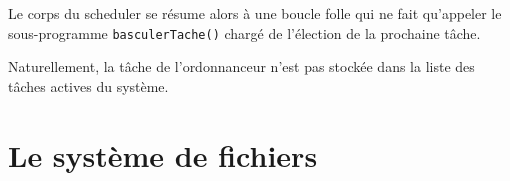 \documentclass{book}
\begin{document}
   Le corps du scheduler se résume alors à une boucle folle qui ne
fait qu'appeler le sous-programme {\tt basculerTache()} chargé de
l'élection de la prochaine tâche.

   Naturellement, la tâche de l'ordonnanceur n'est pas stockée dans la
liste des tâches actives du système.

\section{Le système de fichiers}


%
\appendix


\printindex
\end{document}
